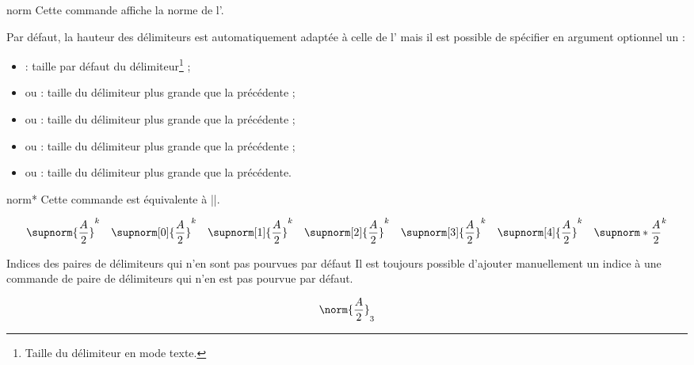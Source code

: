 \documentclass[french,nolocaltoc]{nwejmart}
\newtheorem[style=definition]{fait}
\newtheorem[title=expérience]{experience}
\newtheorem[title-plural=anneaux]{anneau}
\newtheorem[title=idéal,title-plural=idéaux]{ideal}
\begin{document}
\begin{docCommand*}{norm}{}
  Cette commande affiche la norme de l'.

  Par défaut, la hauteur des délimiteurs est automatiquement adaptée à celle de
  l' mais il est possible de spécifier en argument optionnel un
   :
  \begin{itemize}
  \item {} : taille par défaut du délimiteur\footnote{Taille du
      délimiteur en mode texte.} ;
  \item {} ou  : taille du délimiteur plus grande
    que la précédente ;
  \item {} ou  : taille du délimiteur plus grande
    que la précédente ;
  \item {} ou  : taille du délimiteur plus grande
    que la précédente ;
  \item {} ou  : taille du délimiteur plus grande
    que la précédente.
  \end{itemize}
\end{docCommand*}

\begin{docCommand}{norm*}{}
  Cette commande est équivalente à ||.
\end{docCommand}

\begin{bodycode}
\begin{equation}
\supnorm{\frac{A}{2}}^k    \quad
\supnorm[0]{\frac{A}{2}}^k \quad
\supnorm[1]{\frac{A}{2}}^k \quad
\supnorm[2]{\frac{A}{2}}^k \quad
\supnorm[3]{\frac{A}{2}}^k \quad
\supnorm[4]{\frac{A}{2}}^k \quad
\supnorm*{\frac{A}{2}}^k
\end{equation}
\end{bodycode}

\begin{dbremark}{Indices des paires de délimiteurs qui n'en sont pas pourvues par défaut}{}
  Il est toujours possible d'ajouter manuellement un indice à une commande de
  paire de délimiteurs qui n'en est pas pourvue par défaut.
\begin{bodycode}
\begin{equation}
\norm{\frac{A}{2}}_3
\end{equation}
\end{bodycode}
\end{dbremark}
\end{document}
